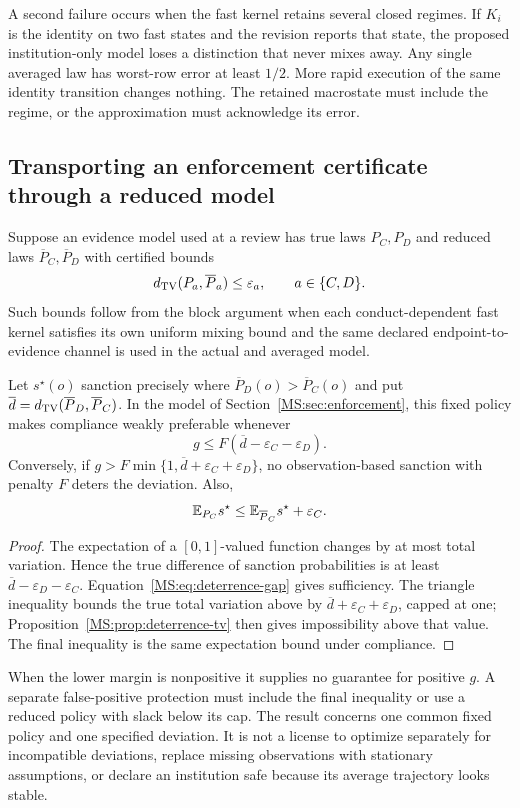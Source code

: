 A second failure occurs when the fast kernel retains several closed regimes. If $K_i$ is the identity on two fast states and the revision reports that state, the proposed institution-only model loses a distinction that never mixes away. Any single averaged law has worst-row error at least $1/2$. More rapid execution of the same identity transition changes nothing. The retained macrostate must include the regime, or the approximation must acknowledge its error.

\subsection{Transporting an enforcement certificate through a reduced model}
Suppose an evidence model used at a review has true laws $P_C,P_D$ and reduced laws $\overline P_C,\overline P_D$ with certified bounds
\[
d_{\mathrm{TV}}(P_a,\overline P_a)\leq\varepsilon_a,\qquad a\in\{C,D\}.
\]
Such bounds follow from the block argument when each conduct-dependent fast kernel satisfies its own uniform mixing bound and the same declared endpoint-to-evidence channel is used in the actual and averaged model.

\begin{MSproposition}\label{MS:prop:robust-deterrence}
Let $s^\star(o)$ sanction precisely where $\overline P_D(o)>\overline P_C(o)$ and put $\overline d=d_{\mathrm{TV}}(\overline P_D,\overline P_C)$. In the model of Section~\ref{MS:sec:enforcement}, this fixed policy makes compliance weakly preferable whenever
\[
g\leq F(\overline d-\varepsilon_C-\varepsilon_D).
\]
Conversely, if $g>F\min\{1,\overline d+\varepsilon_C+\varepsilon_D\}$, no observation-based sanction with penalty $F$ deters the deviation. Also,
\[
\mathbb E_{P_C}s^\star\leq\mathbb E_{\overline P_C}s^\star+\varepsilon_C.
\]
\end{MSproposition}
\begin{proof}
The expectation of a $[0,1]$-valued function changes by at most total variation. Hence the true difference of sanction probabilities is at least $\overline d-\varepsilon_D-\varepsilon_C$. Equation~\eqref{MS:eq:deterrence-gap} gives sufficiency. The triangle inequality bounds the true total variation above by $\overline d+\varepsilon_C+\varepsilon_D$, capped at one; Proposition~\ref{MS:prop:deterrence-tv} then gives impossibility above that value. The final inequality is the same expectation bound under compliance.
\end{proof}

When the lower margin is nonpositive it supplies no guarantee for positive $g$. A separate false-positive protection must include the final inequality or use a reduced policy with slack below its cap. The result concerns one common fixed policy and one specified deviation. It is not a license to optimize separately for incompatible deviations, replace missing observations with stationary assumptions, or declare an institution safe because its average trajectory looks stable.

